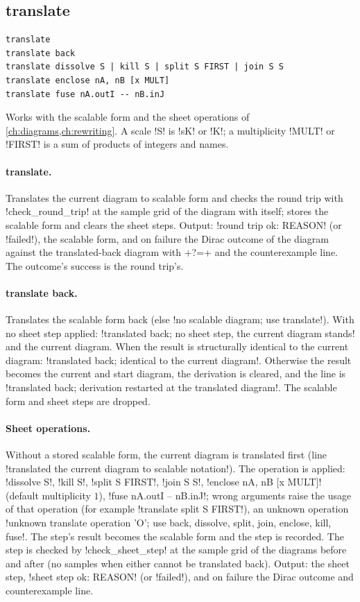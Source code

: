 \subsection{translate}\label{sec:language-translate}

\begin{lstlisting}[style=azx]
translate
translate back
translate dissolve S | kill S | split S FIRST | join S S
translate enclose nA, nB [x MULT]
translate fuse nA.outI -- nB.inJ
\end{lstlisting}
Works with the scalable form and the sheet operations of \cref{ch:diagrams,ch:rewriting}. A scale \code!S! is \code!sK! or \code!K!; a multiplicity \code!MULT! or \code!FIRST! is a sum of products of integers and names.

\paragraph{translate.} Translates the current diagram to scalable form and checks the round trip with \py!check_round_trip! at the sample grid of the diagram with itself; stores the scalable form and clears the sheet steps. Output: \code!round trip ok: REASON! (or \code!failed!), the scalable form, and on failure the Dirac outcome of the diagram against the translated-back diagram with \code+?=+ and the counterexample line. The outcome's success is the round trip's.

\paragraph{translate back.} Translates the scalable form back (else \code!no scalable diagram; use translate!). With no sheet step applied: \code!translated back; no sheet step, the current diagram stands! and the current diagram. When the result is structurally identical to the current diagram: \code!translated back; identical to the current diagram!. Otherwise the result becomes the current and start diagram, the derivation is cleared, and the line is \code!translated back; derivation restarted at the translated diagram!. The scalable form and sheet steps are dropped.

\paragraph{Sheet operations.} Without a stored scalable form, the current diagram is translated first (line \code!translated the current diagram to scalable notation!). The operation is applied: \code!dissolve S!, \code!kill S!, \code!split S FIRST!, \code!join S S!, \code!enclose nA, nB [x MULT]! (default multiplicity $1$), \code!fuse nA.outI -- nB.inJ!; wrong arguments raise the usage of that operation (for example \code!translate split S FIRST!), an unknown operation \code!unknown translate operation 'O'; use back, dissolve, split, join, enclose, kill, fuse!. The step's result becomes the scalable form and the step is recorded. The step is checked by \py!check_sheet_step! at the sample grid of the diagrams before and after (no samples when either cannot be translated back). Output: the sheet step, \code!sheet step ok: REASON! (or \code!failed!), and on failure the Dirac outcome and counterexample line.

